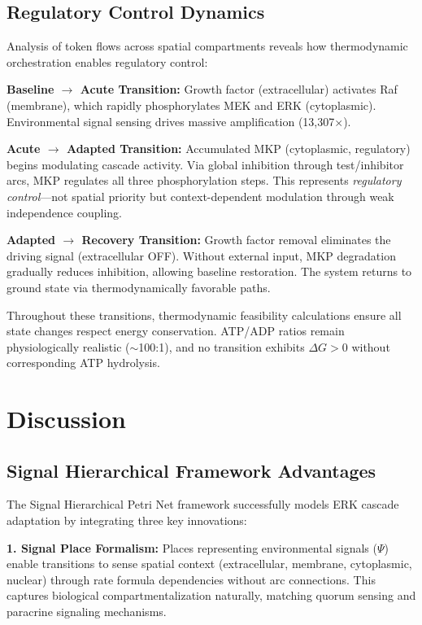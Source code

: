 \documentclass[twocolumn,11pt]{article}
\newcommand{\shpn}{Signal Hierarchical Petri Net}
\newcommand{\erk}{ERK}
\newcommand{\mkp}{MKP}
\newcommand{\dg}{\Delta G}
\begin{document}
\subsection{Regulatory Control Dynamics}

Analysis of token flows across spatial compartments reveals how thermodynamic orchestration enables regulatory control:

\textbf{Baseline $\to$ Acute Transition:} Growth factor (extracellular) activates Raf (membrane), which rapidly phosphorylates MEK and \erk{} (cytoplasmic). Environmental signal sensing drives massive amplification (13,307$\times$).

\textbf{Acute $\to$ Adapted Transition:} Accumulated \mkp{} (cytoplasmic, regulatory) begins modulating cascade activity. Via global inhibition through test/inhibitor arcs, \mkp{} regulates all three phosphorylation steps. This represents \textit{regulatory control}---not spatial priority but context-dependent modulation through weak independence coupling.

\textbf{Adapted $\to$ Recovery Transition:} Growth factor removal eliminates the driving signal (extracellular OFF). Without external input, \mkp{} degradation gradually reduces inhibition, allowing baseline restoration. The system returns to ground state via thermodynamically favorable paths.

Throughout these transitions, thermodynamic feasibility calculations ensure all state changes respect energy conservation. ATP/ADP ratios remain physiologically realistic ($\sim$100:1), and no transition exhibits $\dg{} > 0$ without corresponding ATP hydrolysis.

\section{Discussion}

\subsection{Signal Hierarchical Framework Advantages}

The \shpn{} framework successfully models ERK cascade adaptation by integrating three key innovations:

\textbf{1. Signal Place Formalism:} Places representing environmental signals ($\Psi$) enable transitions to sense spatial context (extracellular, membrane, cytoplasmic, nuclear) through rate formula dependencies without arc connections. This captures biological compartmentalization naturally, matching quorum sensing and paracrine signaling mechanisms.
\end{document}
